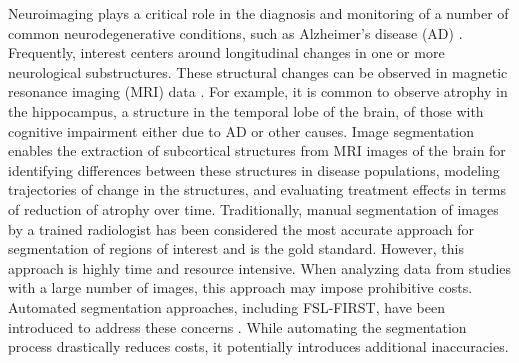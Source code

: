 \documentclass[12pt]{article}
\theoremstyle{definition}
\begin{document}

Neuroimaging plays a critical role in the diagnosis and monitoring of a number of common neurodegenerative conditions, such as Alzheimer's disease (AD) \citep{knopmanAlzheimerDisease2021}. Frequently, interest centers around longitudinal changes in one or more neurological substructures. These structural changes can be observed in magnetic resonance imaging (MRI) data \citep{crainiceanu2016tutorial}. For example, it is common to observe atrophy in the hippocampus, a structure in the temporal lobe of the brain, of those with  cognitive impairment either due to AD or other causes. Image segmentation enables the extraction of subcortical structures from MRI images of the brain for identifying differences between these structures in disease populations, modeling trajectories of change in the structures, and evaluating treatment effects in terms of reduction of atrophy over time. Traditionally, manual segmentation of images by a trained radiologist has been considered the most accurate approach for segmentation of regions of interest and is the gold standard. However, this approach is highly time and resource intensive. When analyzing data from studies with a large number of images, this approach may impose prohibitive costs. Automated segmentation approaches, including FSL-FIRST, have been introduced to address these concerns \citep{patenaudeBayesianModelShape2011}. While automating the segmentation process drastically reduces costs, it potentially introduces additional inaccuracies.
\end{document}

